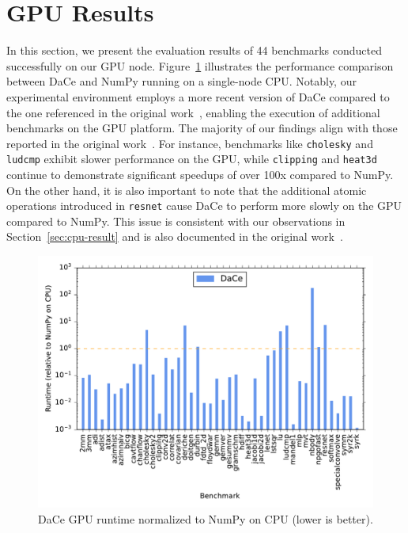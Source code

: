 \section{GPU Results}
\label{sec:gpu-result}

In this section, we present the evaluation results of 44 benchmarks conducted successfully on our GPU node. Figure~\ref{fig:heatmap_gpu} illustrates the performance comparison between DaCe and NumPy running on a single-node CPU. Notably, our experimental environment employs a more recent version of DaCe compared to the one referenced in the original work~\cite{dace2021}, enabling the execution of additional benchmarks on the GPU platform. 
The majority of our findings align with those reported in the original work~\cite{dace2021}. For instance, benchmarks like \texttt{cholesky} and \texttt{ludcmp} exhibit slower performance on the GPU, while \texttt{clipping} and \texttt{heat3d} continue to demonstrate significant speedups of over 100x compared to NumPy. On the other hand, it is also important to note that the additional atomic operations introduced in \texttt{resnet} cause DaCe to perform more slowly on the GPU compared to NumPy. This issue is consistent with our observations in Section~\ref{sec:cpu-result} and is also documented in the original work~\cite{dace2021}.

\begin{figure}[!tp]
    \centering
    \includegraphics[width=.45\textwidth]{imgs/heatmap_gpu.pdf}
    \caption{DaCe GPU runtime normalized to NumPy on CPU (lower is better).}
    \label{fig:heatmap_gpu}
\end{figure}

